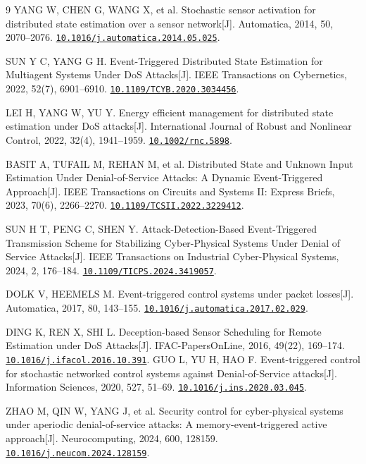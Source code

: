 \newcommand{\doi}[1]{\href{https://doi.org/#1}{\nolinkurl{#1}}}
\begin{thebibliography}{9}
YANG W, CHEN G, WANG X, et al. Stochastic sensor activation for distributed state estimation over a sensor network[J]. Automatica, 2014, 50, 2070--2076. \doi{10.1016/j.automatica.2014.05.025}.

SUN Y C, YANG G H. Event-Triggered Distributed State Estimation for Multiagent Systems Under DoS Attacks[J]. IEEE Transactions on Cybernetics, 2022, 52(7), 6901--6910. \doi{10.1109/TCYB.2020.3034456}.

LEI H, YANG W, YU Y. Energy efficient management for distributed state estimation under DoS attacks[J]. International Journal of Robust and Nonlinear Control, 2022, 32(4), 1941--1959. \doi{10.1002/rnc.5898}.

BASIT A, TUFAIL M, REHAN M, et al. Distributed State and Unknown Input Estimation Under Denial-of-Service Attacks: A Dynamic Event-Triggered Approach[J]. IEEE Transactions on Circuits and Systems II: Express Briefs, 2023, 70(6), 2266--2270. \doi{10.1109/TCSII.2022.3229412}.

SUN H T, PENG C, SHEN Y. Attack-Detection-Based Event-Triggered Transmission Scheme for Stabilizing Cyber-Physical Systems Under Denial of Service Attacks[J]. IEEE Transactions on Industrial Cyber-Physical Systems, 2024, 2, 176--184. \doi{10.1109/TICPS.2024.3419057}.

DOLK V, HEEMELS M. Event-triggered control systems under packet losses[J]. Automatica, 2017, 80, 143--155. \doi{10.1016/j.automatica.2017.02.029}.

DING K, REN X, SHI L. Deception-based Sensor Scheduling for Remote Estimation under DoS Attacks[J]. IFAC-PapersOnLine, 2016, 49(22), 169--174. \doi{10.1016/j.ifacol.2016.10.391}.
GUO L, YU H, HAO F. Event-triggered control for stochastic networked control systems against Denial-of-Service attacks[J]. Information Sciences, 2020, 527, 51--69. \doi{10.1016/j.ins.2020.03.045}.

ZHAO M, QIN W, YANG J, et al. Security control for cyber-physical systems under aperiodic denial-of-service attacks: A memory-event-triggered active approach[J]. Neurocomputing, 2024, 600, 128159. \doi{10.1016/j.neucom.2024.128159}.
\end{thebibliography}
